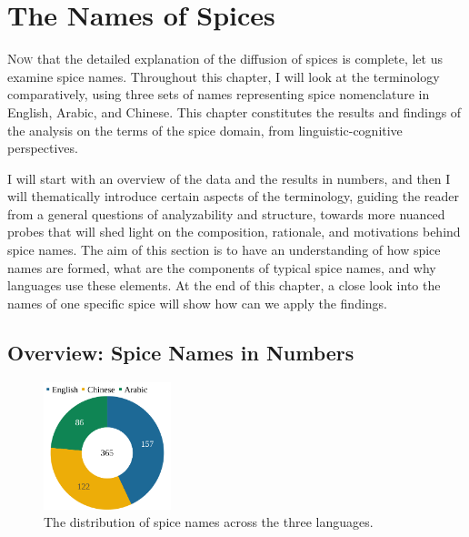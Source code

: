 \chapter{The Names of Spices}
\label{ch:names}



\lettrine[lines=\iniciale]{\textcolor{\accentcolor}{N}}{ow} that the detailed explanation of the diffusion of spices is complete, let us examine spice names. Throughout this chapter, I will look at the terminology comparatively, using three sets of names representing spice nomenclature in English, Arabic, and Chinese. This chapter constitutes the results and findings of the analysis on the terms of the spice domain, from linguistic-cognitive perspectives. 

I will start with an overview of the data and the results in numbers, and then I will thematically introduce certain aspects of the terminology, guiding the reader from a general questions of analyzability and structure, towards more nuanced probes that will shed light on the composition, rationale, and motivations behind spice names. The aim of this section is to have an understanding of how spice names are formed, what are the components of typical spice names, and why languages use these elements. At the end of this chapter, a close look into the names of one specific spice will show how can we apply the findings. 

\section{Overview: Spice Names in Numbers}

\begin{figure}
  \vspace{-\baselineskip}
  \includegraphics[width=0.33\textwidth]{imgs/plots/languages_pie.pdf}
  \caption{The distribution of spice names across the three languages.}
  \label{fig:languages_pie}
\end{figure}


